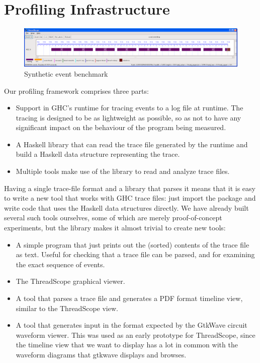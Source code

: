 \section{Profiling Infrastructure}
\begin{figure}
\begin{center}
\includegraphics[scale=0.3]{eventbench.png}
\end{center}
\caption{Synthetic event benchmark}
\label{f:event-bench}
\end{figure}

Our profiling framework comprises three parts:

\begin{itemize}
\item Support in GHC's runtime for tracing events to a log file at
  runtime.  The tracing is designed to be as lightweight as possible,
  so as not to have any significant impact on the behaviour of the
  program being measured.

\item A Haskell library  that can read the trace file
  generated by the runtime and build a Haskell data structure
  representing the trace.

\item Multiple tools make use of the  library to read and
  analyze trace files.
\end{itemize}

Having a single trace-file format and a library that parses it means
that it is easy to write a new tool that works with GHC trace files:
just import the  package and write code that uses the
Haskell data structures directly.  We have already built several such
tools ourselves, some of which are merely proof-of-concept
experiments, but the  library makes it almost trivial to
create new tools:

\begin{itemize}
\item A simple program that just prints out the (sorted) contents of
  the trace file as text.  Useful for checking that a trace file can
  be parsed, and for examining the exact sequence of events.

\item The ThreadScope graphical viewer.

\item A tool that parses a trace file and generates a PDF format
  timeline view, similar to the ThreadScope view.

\item A tool that generates input in the format expected by the
  GtkWave circuit waveform viewer.  This was used as an early
  prototype for ThreadScope, since the timeline view that we want to
  display has a lot in common with the waveform diagrams that gtkwave
  displays and browses.
\end{itemize}


